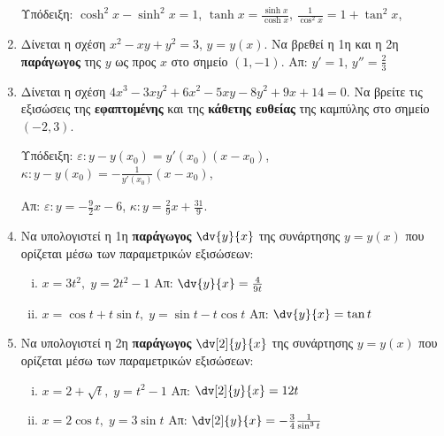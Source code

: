 \documentclass[a4paper,table]{report}
\begin{document}
\begin{enumerate}
    \textcolor{Col1}{Υπόδειξη:} 
      $ \cosh^{2}{x} - \sinh^{2}{x} = 1 $, \;
      $ \tanh{x} = \frac{\sinh{x}}{\cosh{x}}$, \; 
      $ \frac{1}{\cos^{2}{x}} = 1+ \tan^{2}{x} $, \; 
      \begin{enumerate}[(i)]
      \end{enumerate}

  \item Δίνεται η σχέση $ x^{2} - xy + y^{2} = 3 $, $ y=y(x) $. Να βρεθεί η 1η
    και η 2η \textbf{παράγωγος} της $y$ ως προς $x$ στο σημείο $ (1,-1) $.
    \hfill Απ: $ y' = 1$, $ y'' = \frac{2}{3} $

  \item Δίνεται η σχέση $ 4x^{3} - 3xy^{2} + 6x^{2} - 5xy - 8 y^{2} + 9x + 14
    = 0$. Να βρείτε τις εξισώσεις της \textbf{εφαπτομένης} και της \textbf{κάθετης
    ευθείας} της καμπύλης στο σημείο $ (-2,3) $.

    \textcolor{Col1}{Υπόδειξη:} 
    $ \varepsilon: y-y(x_{0}) = y'(x_{0})(x- x_{0}) $, \;
    $ \kappa: y-y(x_{0}) = -\frac{1}{y'(x_{0})}(x- x_{0}) $, \;

    \hfill Απ: $\varepsilon\colon y = -\frac{9}{2} x - 6 $, 
    $\kappa\colon y = \frac{2}{9} x + \frac{31}{9} $.

  \item Να υπολογιστεί η 1η \textbf{παράγωγος} $ \dv{y}{x} $ της συνάρτησης $ y=y(x) $ 
    που ορίζεται μέσω των \textcolor{Col1}{παραμετρικών εξισώσεων}:
    \begin{enumerate}[i)]
      \item $ x = 3t^{2}, \; y=2t^{2}-1 $ \hfill Απ: $ \dv{y}{x} = \frac{4}{9t} $ 
      \item $ x = \cos{t} + t \sin{t}, \; y= \sin{t} - t \cos{t} $ 
        \hfill Απ: $ \dv{y}{x} = \tan{t} $ 
    \end{enumerate}

  \item Να υπολογιστεί η 2η \textbf{παράγωγος} $ \dv[2]{y}{x}$  της συνάρτησης 
    $ y=y(x) $ που ορίζεται μέσω των \textcolor{Col1}{παραμετρικών εξισώσεων}:
    \begin{enumerate}[i)]
      \item $ x=2 + \sqrt{t}, \; y=t^{2}-1 $ \hfill Απ: $ \dv[2]{y}{x} = 12 t $ 
      \item $ x=2 \cos{t}, \; y= 3 \sin{t}  $ \hfill Απ: $ \dv[2]{y}{x} = -
        \frac{3}{4} \frac{1}{\sin^{3}{t}} $  
    \end{enumerate}


\end{enumerate}
\end{document}
